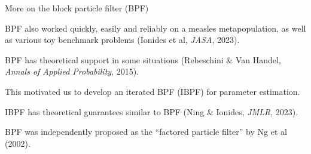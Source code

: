 \documentclass{beamer}
\begin{document}
\begin{frame}{More on the block particle filter (BPF)}

\bi
\item BPF also worked quickly, easily and reliably on a measles metapopulation, as well as various toy benchmark problems (Ionides et al, {\it JASA}, 2023).

        \vspace{2mm}

\item BPF has theoretical support in some situations (Rebeschini \& Van Handel, {\it Annals of Applied Probability}, 2015).

        \vspace{2mm}

      \item This motivated us to develop an iterated BPF (IBPF) for parameter estimation.
        
        \vspace{2mm}

      \item IBPF has theoretical guarantees similar to BPF (Ning \& Ionides, {\it JMLR}, 2023).
        
        \vspace{2mm}

        
\item BPF was independently proposed as the ``factored particle filter'' by Ng et al (2002).

\ei

\end{frame}
\end{document}
